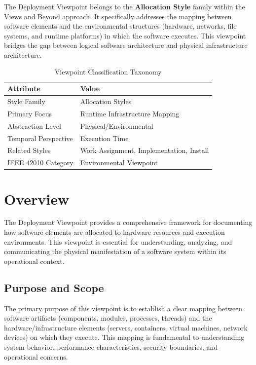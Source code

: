 \documentclass[11pt,letterpaper]{article}
\begin{document}
The Deployment Viewpoint belongs to the \textbf{Allocation Style} family within the Views and Beyond approach. It specifically addresses the mapping between software elements and the environmental structures (hardware, networks, file systems, and runtime platforms) in which the software executes. This viewpoint bridges the gap between logical software architecture and physical infrastructure architecture.

\begin{table}[H]
\centering
\caption{Viewpoint Classification Taxonomy}
\begin{tabular}{@{}L{4cm}L{10cm}@{}}
\toprule
\textbf{Attribute} & \textbf{Value} \\
\midrule
Style Family & Allocation Styles \\
Primary Focus & Runtime Infrastructure Mapping \\
Abstraction Level & Physical/Environmental \\
Temporal Perspective & Execution Time \\
Related Styles & Work Assignment, Implementation, Install \\
IEEE 42010 Category & Environmental Viewpoint \\
\bottomrule
\end{tabular}
\end{table}

\section{Overview}

The Deployment Viewpoint provides a comprehensive framework for documenting how software elements are allocated to hardware resources and execution environments. This viewpoint is essential for understanding, analyzing, and communicating the physical manifestation of a software system within its operational context.

\subsection{Purpose and Scope}

The primary purpose of this viewpoint is to establish a clear mapping between software artifacts (components, modules, processes, threads) and the hardware/infrastructure elements (servers, containers, virtual machines, network devices) on which they execute. This mapping is fundamental to understanding system behavior, performance characteristics, security boundaries, and operational concerns.
\end{document}
